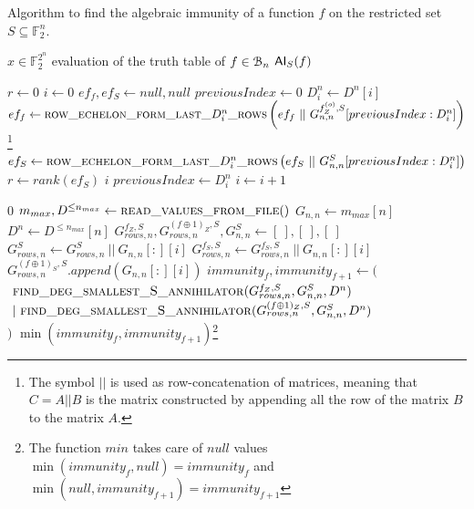\documentclass[11pt]{llncs}
\begin{document}
\begin{algorithm}\label{alg:RMApproach}
	\caption{Algorithm to find the algebraic immunity of a function $f$ on the restricted set $S\subseteq \mathbb{F}_2^n$.}
	\begin{algorithmic}[1]
		\Require $x\in \mathbb{F}_2^{2^n}$ evaluation of the truth table of $f\in \mathcal{B}_{n}$
		\Ensure $\mathsf{AI}_S(f)$
		
		\State $r \gets 0$
		\State $i \gets 0$
		\State $ef_f, ef_S \gets null, null$
		\State $previousIndex \gets 0$
		\State $D_i^n \gets D^n[i]$
		\State $ef_f\gets \mbox{\textsc{row\_echelon\_form\_last\_}}D_i^n\mbox{\textsc{\_rows}}\left(ef_f\ ||\  G_{n,n}^{f_Z^{(o)},S}[previousIndex:D_i^n]\right)$\footnote{The symbol $||$ is used as row-concatenation of matrices, meaning that $C = A||B$ is the matrix constructed by appending all the row of the matrix $B$ to the matrix $A$.}
		\State $ef_S \gets \mbox{\textsc{row\_echelon\_form\_last\_}}D_i^n\mbox{\textsc{\_rows}}\left(ef_S\ ||\ G_{n,n}^S[previousIndex:D_i^n]\right)$
		\State $r \gets rank\left(ef_S\right)$
		\State
		\Return $i$
		\EndIf
		\State $previousIndex \gets D_i^n$
		\State $i \gets i+1$
		\EndWhile
		\EndFunction
		\State
		
		\Return $0$
		\EndIf
		\State $m_{max}, D^{\leq n_{max}}\gets \mbox{\textsc{read\_values\_from\_file}}()$
		\State $G_{n,n}\gets m_{max}[n]$
		\State $D^n \gets D^{\leq n_{max}}[n]$
		\State $G_{rows,n}^{f_Z,S}, G_{rows,n}^{(f\oplus 1)_Z,S}, G_{n,n}^S \gets [\ ], [\ ], [\ ]$
		\State $G_{rows,n}^{S} \gets G_{rows,n}^{S}\ ||\ G_{n,n}[:][i]$
		\State $G_{rows,n}^{f_S,S} \gets G_{rows,n}^{f_S,S}\ ||\ G_{n,n}[:][i]$
		\Else
		\State $G_{rows,n}^{(f\oplus 1)_S,S}.append\left(G_{n,n}[:][i]\right)$
		\EndIf
		\EndIf
		\EndFor
		\State $immunity_f, immunity_{f+1} \leftarrow ($\\
		$\ \mbox{\textsc{find\_deg\_smallest\_S\_annihilator}}(G_{rows,n}^{f_Z,S}, G_{n,n}^S,D^{n})$\\
		$\ |\ \mbox{\textsc{find\_deg\_smallest\_S\_annihilator}}(G_{rows,n}^{(f\oplus 1)_Z,S}, G_{n,n}^S, D^{n})$\\
		$)$
		\State \Return $\min(immunity_f, immunity_{f+1})$\footnote{The function $min$ takes care of $null$ values $\min(immunity_f, null) = immunity_f$ and $\min(null, immunity_{f+1}) = immunity_{f+1}$}
	\end{algorithmic}
\end{algorithm}
\end{document}

